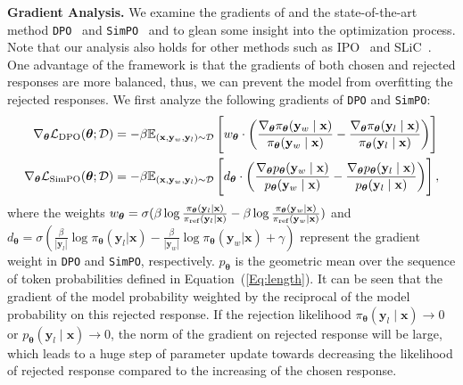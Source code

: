 \textbf{Gradient Analysis.}
We examine the gradients of \method and the state-of-the-art method \texttt{DPO}~\citep{rafailov2024direct} and \texttt{SimPO}~\citep{meng2024simpo} and to glean some insight into the optimization process. Note that our analysis also holds for other methods such as IPO~\citep{azar2024general} and SLiC~\citep{zhao2023slic}. One advantage of the \method framework is that the gradients of both chosen and rejected responses are more balanced, thus, we can prevent the model from overfitting the rejected responses. We first analyze the following gradients of \texttt{DPO} and \texttt{SimPO}:
\begin{align}
\nabla_{\boldsymbol{\theta}} \mathcal{L}_{\rm{DPO}}({\boldsymbol{\theta}}; \mathcal{D}) &= -\beta \mathbb{E}_{(\mathbf{x}, \mathbf{y}_w, \mathbf{y}_l) \sim \mathcal{D}} \left[ w_{\boldsymbol{\theta}} \cdot \left( \frac{\nabla_{\boldsymbol{\theta}} \pi_{\boldsymbol{\theta}}(\mathbf{y}_w \mid  \mathbf{x})}{\pi_{\boldsymbol{\theta}}(\mathbf{y}_w \mid  \mathbf{x})} - \frac{\nabla_{\boldsymbol{\theta}} \pi_{\boldsymbol{\theta}}(\mathbf{y}_l \mid \mathbf{x})}{\pi_{\boldsymbol{\theta}}(\mathbf{y}_l \mid \mathbf{x})}  \right) \right] \\
\nabla_{\boldsymbol{\theta}} \mathcal{L}_{\rm{SimPO}}({\boldsymbol{\theta}}; \mathcal{D}) &= -\beta \mathbb{E}_{(\mathbf{x}, \mathbf{y}_w, \mathbf{y}_l) \sim \mathcal{D}} \left[ d_{\boldsymbol{\theta}} \cdot \left( \frac{\nabla_{\boldsymbol{\theta}} p_{\boldsymbol{\theta}}(\mathbf{y}_w \mid  \mathbf{x})}{p_{\boldsymbol{\theta}}(\mathbf{y}_w \mid  \mathbf{x})} - \frac{\nabla_{\boldsymbol{\theta}} p_{\boldsymbol{\theta}}(\mathbf{y}_l \mid \mathbf{x})}{p_{\boldsymbol{\theta}}(\mathbf{y}_l \mid \mathbf{x})}  \right) \right], \label{Eq:SimPO-gradient}
\end{align}
where the weights $w_{\boldsymbol{\theta}} = \sigma ( \beta \log \frac{\pi_{\boldsymbol{\theta}}(\mathbf{y}_l \mid \mathbf{x})}{\pi_{\rm{ref}}(\mathbf{y}_l \mid \mathbf{x})} - \beta \log \frac{\pi_{\boldsymbol{\theta}}(\mathbf{y}_w \mid \mathbf{x})}{\pi_{\rm{ref}}(\mathbf{y}_w \mid \mathbf{x})})$ and $d_{\boldsymbol{\theta}} = \sigma ( \frac{\beta}{|\mathbf{y}_{l}|} \log {\pi_{\boldsymbol{\theta}}(\mathbf{y}_l|\mathbf{x})} -\frac{\beta}{|\mathbf{y}_{w}|} \log {\pi_{\boldsymbol{\theta}}(\mathbf{y}_w | \mathbf{x})}+\gamma)$ represent the gradient weight in \texttt{DPO} and \texttt{SimPO}, respectively. $p_{\boldsymbol{\theta}}$ is the geometric mean over the sequence of token probabilities defined in Equation~(\ref{Eq:length}). It can be seen that the gradient of the model probability weighted by the reciprocal of the model probability on this rejected response. 
If the rejection likelihood $\pi_{\boldsymbol{\theta}}(\mathbf{y}_{l} \mid \mathbf{x}) \rightarrow 0 $ or $p_{\boldsymbol{\theta}}(\mathbf{y}_{l} \mid \mathbf{x}) \rightarrow 0 $, the norm of the gradient on rejected response will be large, which leads to a huge step of parameter update towards decreasing the likelihood of rejected response compared to the increasing of the chosen response. 

